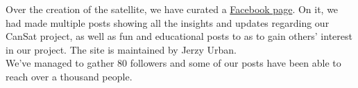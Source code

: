 \documentclass[class=report, crop=false]{standalone}
\begin{document}
Over the creation of the satellite, we have curated a \href{https://www.facebook.com/The-Can-Openers-105096144746388}{Facebook page}.
On it, we had made multiple posts showing all the insights and updates regarding our CanSat project, as well as fun and educational posts to as to gain others' interest in our project.
The site is maintained by Jerzy Urban. \\
We've managed to gather 80 followers and some of our posts have been able to reach over a thousand people. 
\end{document}
